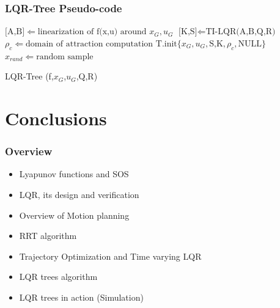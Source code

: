 \documentclass{beamer}
\begin{document}

\begin{frame}
\frametitle{LQR-Tree Pseudo-code}
\begin{algorithm}[H]
\begin{algorithmic}[1] %
\tiny{
\STATE $\text{[A,B]} \Leftarrow \text{linearization of f(x,u) around }x_G, u_G$
\STATE $\text{[K,S]} \Leftarrow \text{TI-LQR(A,B,Q,R)}$
\STATE $\rho_c \Leftarrow \text{domain of attraction computation}$
\STATE $\text{T.init}\{ x_G, u_G, \text{S,K}, \rho_c, \text{NULL} \}$
\STATE $x_{rand} \Leftarrow \text{random sample}$
\ENDIF
{}
\ENDIF
{}
\ENDFOR
}
\end{algorithmic}
\caption{LQR-Tree (f,$x_G$,$u_G$,Q,R) \cite{p1}}
\label{algLQR}
\end{algorithm}
\end{frame}


\section{Conclusions}
\begin{frame}
\frametitle{Overview}
\begin{itemize}
\item Lyapunov functions and SOS \vspace{.2cm}
\item LQR, its design and verification \vspace{.2cm}
\item Overview of Motion planning \vspace{.2cm}
\item RRT algorithm \vspace{.2cm}
\item Trajectory Optimization and Time varying LQR \vspace{.2cm}
\item LQR trees algorithm \vspace{.2cm}
\item LQR trees in action (Simulation) \vspace{.2cm}
\end{itemize}
\end{frame}
\end{document}
